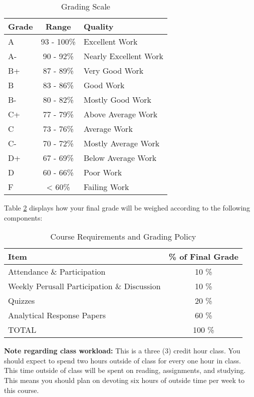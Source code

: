 \documentclass[11pt,]{article}
\begin{document}
\begin{table}[!h]

\caption{\label{tab:grade_scale}Grading Scale}
\centering
\fontsize{10}{12}\selectfont
\begin{tabular}[t]{l|c|l}
\hline
\textbf{Grade} & \textbf{Range} & \textbf{Quality}\\
\hline
A & 93 - 100\% & Excellent Work\\
\hline
A- & 90 - 92\% & Nearly Excellent Work\\
\hline
B+ & 87 - 89\% & Very Good Work\\
\hline
B & 83 - 86\% & Good Work\\
\hline
B- & 80 - 82\% & Mostly Good Work\\
\hline
C+ & 77 - 79\% & Above Average Work\\
\hline
C & 73 - 76\% & Average Work\\
\hline
C- & 70 - 72\% & Mostly Average Work\\
\hline
D+ & 67 - 69\% & Below Average Work\\
\hline
D & 60 - 66\% & Poor Work\\
\hline
F & < 60\% & Failing Work\\
\hline
\end{tabular}
\end{table}

Table \ref{tab:weight_table} displays how your final grade will be
weighed according to the following components:

\renewcommand{\arraystretch}{1.5}

\begin{table}[!h]

\caption{\label{tab:weight_table}Course Requirements and Grading Policy}
\centering
\fontsize{10}{12}\selectfont
\begin{tabular}[t]{lc}
\toprule
\textbf{Item} & \textbf{\% of Final Grade}\\
\midrule
Attendance \& Participation & 10 \%\\
Weekly Perusall Participation \& Discussion & 10 \%\\
Quizzes & 20 \%\\
Analytical Response Papers & 60 \%\\
TOTAL & 100 \%\\
\bottomrule
\end{tabular}
\end{table}

\textbf{Note regarding class workload:} This is a three (3) credit hour
class. You should expect to spend two hours outside of class for every
one hour in class. This time outside of class will be spent on reading,
assignments, and studying. This means you should plan on devoting six
hours of outside time per week to this course.
\end{document}
